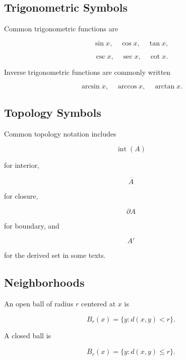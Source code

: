 \subsection{Trigonometric Symbols}
\label{subsec:trigonometric-symbols-reference}

Common trigonometric functions are

\[
\boxed{
\sin x,
\quad
\cos x,
\quad
\tan x,
}
\]

\[
\boxed{
\csc x,
\quad
\sec x,
\quad
\cot x.
}
\]

Inverse trigonometric functions are commonly written

\[
\boxed{
\arcsin x,
\quad
\arccos x,
\quad
\arctan x.
}
\]

\subsection{Topology Symbols}
\label{subsec:topology-symbols-reference}

Common topology notation includes

\[
\boxed{
\operatorname{int}(A)
}
\]

for interior,

\[
\boxed{
\overline{A}
}
\]

for closure,

\[
\boxed{
\partial A
}
\]

for boundary, and

\[
\boxed{
A'
}
\]

for the derived set in some texts.

\subsection{Neighborhoods}
\label{subsec:neighborhood-symbols-reference}

An open ball of radius \(r\) centered at \(x\) is

\[
\boxed{
B_r(x)
=
\{
y:d(x,y)<r
\}.
}
\]

A closed ball is

\[
\boxed{
\overline{B}_r(x)
=
\{
y:d(x,y)\leq r
\}.
}
\]

